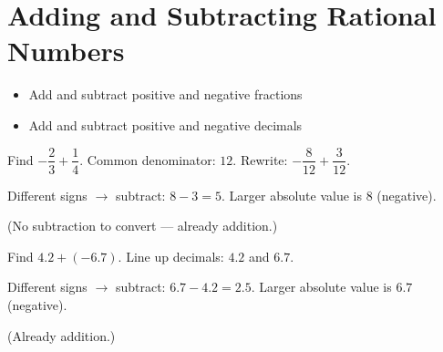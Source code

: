\section{Adding and Subtracting Rational Numbers}

\begin{stepGoal}
\begin{itemize}
    \item Add and subtract positive and negative fractions
    \item Add and subtract positive and negative decimals
\end{itemize}
\end{stepGoal}

\begin{stepVocabBox}
\end{stepVocabBox}

\begin{stepsCard}
\end{stepsCard}

\begin{stepExample}{Find $-\dfrac{2}{3} + \dfrac{1}{4}$.}
     Common denominator: $12$. Rewrite: $-\dfrac{8}{12} + \dfrac{3}{12}$.

     Different signs $\to$ subtract: $8 - 3 = 5$. Larger absolute value is $8$ (negative).

     (No subtraction to convert — already addition.)
\end{stepExample}

\begin{stepExample}{Find $4.2 + (-6.7)$.}
     Line up decimals: $4.2$ and $6.7$.

     Different signs $\to$ subtract: $6.7 - 4.2 = 2.5$. Larger absolute value is $6.7$ (negative).

     (Already addition.)
\end{stepExample}

